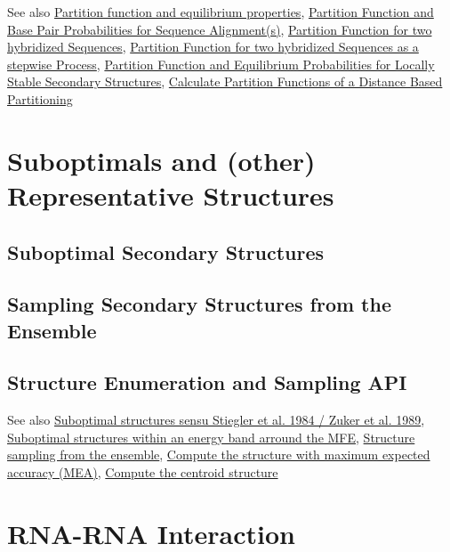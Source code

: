 \begin{DoxySeeAlso}{See also}
\hyperlink{group__pf__fold}{Partition function and equilibrium properties}, \hyperlink{group__consensus__pf__fold}{Partition Function and Base Pair Probabilities for Sequence Alignment(s)}, \hyperlink{group__pf__cofold}{Partition Function for two hybridized Sequences}, \hyperlink{group__up__cofold}{Partition Function for two hybridized Sequences as a stepwise Process}, \hyperlink{group__local__pf__fold}{Partition Function and Equilibrium Probabilities for Locally Stable Secondary Structures}, \hyperlink{group__kl__neighborhood__pf}{Calculate Partition Functions of a Distance Based Partitioning}
\end{DoxySeeAlso}
 \hypertarget{suboptimal_structures}{}\section{Suboptimals and (other) Representative Structures}\label{suboptimal_structures}
\hypertarget{suboptimal_structures_sec_suboptimals}{}\subsection{Suboptimal Secondary Structures}\label{suboptimal_structures_sec_suboptimals}
\hypertarget{suboptimal_structures_sec_samples}{}\subsection{Sampling Secondary Structures from the Ensemble}\label{suboptimal_structures_sec_samples}
\hypertarget{suboptimal_structures_sec_suboptimals_api}{}\subsection{Structure Enumeration and Sampling A\+PI}\label{suboptimal_structures_sec_suboptimals_api}
\begin{DoxySeeAlso}{See also}
\hyperlink{group__subopt__zuker}{Suboptimal structures sensu Stiegler et al. 1984 / Zuker et al. 1989}, \hyperlink{group__subopt__wuchty}{Suboptimal structures within an energy band arround the M\+FE}, \hyperlink{group__subopt__stochbt}{Structure sampling from the ensemble}, \hyperlink{group__mea__fold}{Compute the structure with maximum expected accuracy (M\+EA)}, \hyperlink{group__centroid__fold}{Compute the centroid structure}
\end{DoxySeeAlso}
 \hypertarget{rip}{}\section{R\+N\+A-\/\+R\+NA Interaction}\label{rip}
